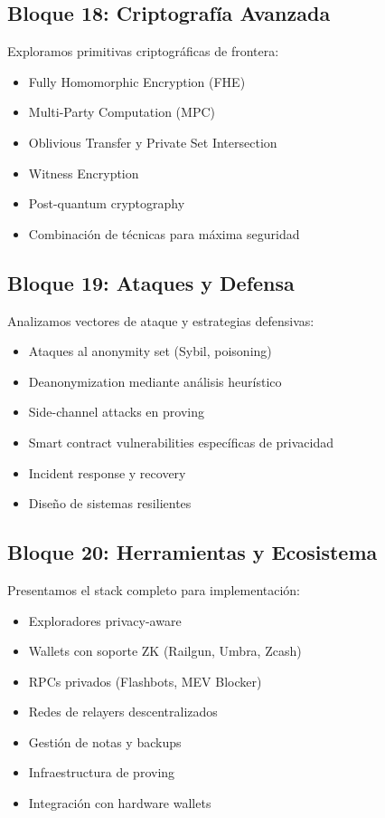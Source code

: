 \documentclass[11pt,a4paper,twoside]{book}
\theoremstyle{definition}
\theoremstyle{remark}
\begin{document}
\subsection*{Bloque 18: Criptografía Avanzada}
Exploramos primitivas criptográficas de frontera:
\begin{itemize}
    \item Fully Homomorphic Encryption (FHE)
    \item Multi-Party Computation (MPC)
    \item Oblivious Transfer y Private Set Intersection
    \item Witness Encryption
    \item Post-quantum cryptography
    \item Combinación de técnicas para máxima seguridad
\end{itemize}

\subsection*{Bloque 19: Ataques y Defensa}
Analizamos vectores de ataque y estrategias defensivas:
\begin{itemize}
    \item Ataques al anonymity set (Sybil, poisoning)
    \item Deanonymization mediante análisis heurístico
    \item Side-channel attacks en proving
    \item Smart contract vulnerabilities específicas de privacidad
    \item Incident response y recovery
    \item Diseño de sistemas resilientes
\end{itemize}

\subsection*{Bloque 20: Herramientas y Ecosistema}
Presentamos el stack completo para implementación:
\begin{itemize}
    \item Exploradores privacy-aware
    \item Wallets con soporte ZK (Railgun, Umbra, Zcash)
    \item RPCs privados (Flashbots, MEV Blocker)
    \item Redes de relayers descentralizados
    \item Gestión de notas y backups
    \item Infraestructura de proving
    \item Integración con hardware wallets
\end{itemize}
\end{document}
